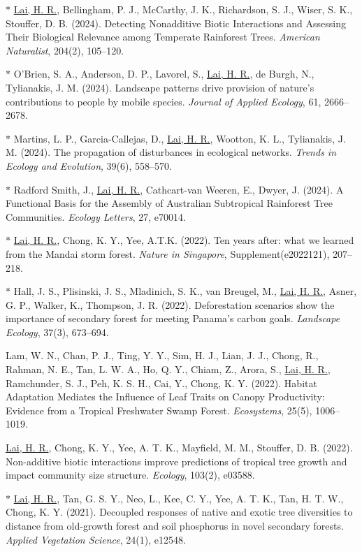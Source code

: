 \documentclass[a4paper]{article}
\begin{document}
$\ast$ \hangindent=1cm \underline{Lai, H. R.}, Bellingham, P. J., McCarthy, J. K., Richardson, S. J., Wiser, S. K., Stouffer, D. B. (2024). Detecting Nonadditive Biotic Interactions and Assessing Their Biological Relevance among Temperate Rainforest Trees. \textit{American Naturalist}, 204(2), 105--120.

$\ast$ \hangindent=1cm O’Brien, S. A., Anderson, D. P., Lavorel, S., \underline{Lai, H. R.}, de Burgh, N., Tylianakis, J. M. (2024). Landscape patterns drive provision of nature’s contributions to people by mobile species. \textit{Journal of Applied Ecology}, 61, 2666--2678.

$\ast$ \hangindent=1cm Martins, L. P., Garcia-Callejas, D., \underline{Lai, H. R.}, Wootton, K. L., Tylianakis, J. M. (2024). The propagation of disturbances in ecological networks. \textit{Trends in Ecology and Evolution}, 39(6), 558--570.

$\ast$ \hangindent=1cm Radford Smith, J., \underline{Lai, H. R.}, Cathcart-van Weeren, E., Dwyer, J. (2024). A Functional Basis for the Assembly of Australian Subtropical Rainforest Tree Communities. \textit{Ecology Letters}, 27, e70014.

$\ast$ \hangindent=1cm \underline{Lai, H. R.}, Chong, K. Y., Yee, A.T.K. (2022). Ten years after: what we learned from the Mandai storm forest. \textit{Nature in Singapore}, Supplement(e2022121), 207–218.

$\ast$ \hangindent=1cm Hall, J. S., Plisinski, J. S., Mladinich, S. K., van Breugel, M., \underline{Lai, H. R.}, Asner, G. P., Walker, K., Thompson, J. R. (2022). Deforestation scenarios show the importance of secondary forest for meeting Panama’s carbon goals. \textit{Landscape Ecology}, 37(3), 673–694.

\hangindent=1cm Lam, W. N., Chan, P. J., Ting, Y. Y., Sim, H. J., Lian, J. J., Chong, R., Rahman, N. E., Tan, L. W. A., Ho, Q. Y., Chiam, Z., Arora, S., \underline{Lai, H. R.}, Ramchunder, S. J., Peh, K. S. H., Cai, Y., Chong, K. Y. (2022). Habitat Adaptation Mediates the Influence of Leaf Traits on Canopy Productivity: Evidence from a Tropical Freshwater Swamp Forest. \textit{Ecosystems}, 25(5), 1006–1019.

\hangindent=1cm \underline{Lai, H. R.}, Chong, K. Y., Yee, A. T. K., Mayfield, M. M., Stouffer, D. B. (2022). Non-additive biotic interactions improve predictions of tropical tree growth and impact community size structure. \textit{Ecology}, 103(2), e03588.

$\ast$ \hangindent=1cm \underline{Lai, H. R.}, Tan, G. S. Y., Neo, L., Kee, C. Y., Yee, A. T. K., Tan, H. T. W., Chong, K. Y. (2021). Decoupled responses of native and exotic tree diversities to distance from old-growth forest and soil phosphorus in novel secondary forests. \textit{Applied Vegetation Science}, 24(1), e12548.
\end{document}
